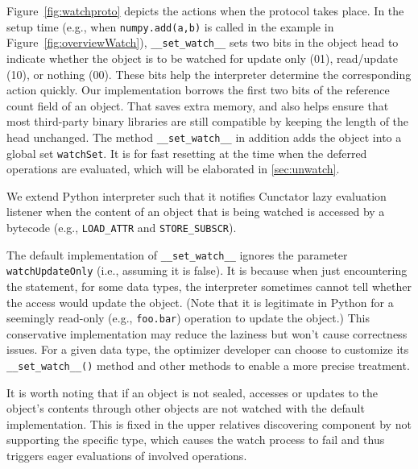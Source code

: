 \documentclass[sigconf]{acmart}\settopmatter{printfolios=true,printccs=false,printacmref=false}\setcopyright{none}
\begin{document}
Figure~\ref{fig:watchproto} depicts the actions when the protocol takes place. In the setup time (e.g., when \texttt{numpy.add(a,b)} is called in the example in Figure~\ref{fig:overviewWatch}), \texttt{\_\_set\_watch\_\_} sets two bits in the object head to indicate whether the object is to be watched for update only (01), read/update (10), or nothing (00). These bits help the interpreter determine the corresponding action quickly. Our implementation borrows the first two bits of the reference count field of an object. That saves extra memory, and also helps ensure that most third-party binary libraries are still compatible by keeping the length of the head unchanged. The method \texttt{\_\_set\_watch\_\_} in addition adds the object into a global set \texttt{watchSet}. It is for fast resetting at the time when the deferred operations are evaluated, which will be elaborated in \cref{sec:unwatch}. 

We extend Python interpreter such that it notifies Cunctator lazy evaluation listener when the content of an object that is being watched is accessed by a bytecode (e.g., \texttt{LOAD\_ATTR} and \texttt{STORE\_SUBSCR}). 

The default implementation of \texttt{\_\_set\_watch\_\_} ignores the parameter \texttt{watchUpdateOnly} (i.e., assuming it is false). It is because when just encountering the statement, for some data types, the interpreter sometimes cannot tell whether the access would update the object. (Note that it is legitimate in Python for a seemingly read-only (e.g., \texttt{foo.bar}) operation to update the object.) This conservative implementation may reduce the laziness but won't cause correctness issues. For a given data type, the optimizer developer can choose to customize its \texttt{\_\_set\_watch\_\_()} method and other methods to enable a more precise treatment. 


It is worth noting that if an object is not sealed, accesses or updates to the object's contents through other objects are not watched with the default implementation. This is fixed in the upper relatives discovering component by not supporting the specific type, which causes the watch process to fail and thus triggers eager evaluations of involved operations.
\end{document}
